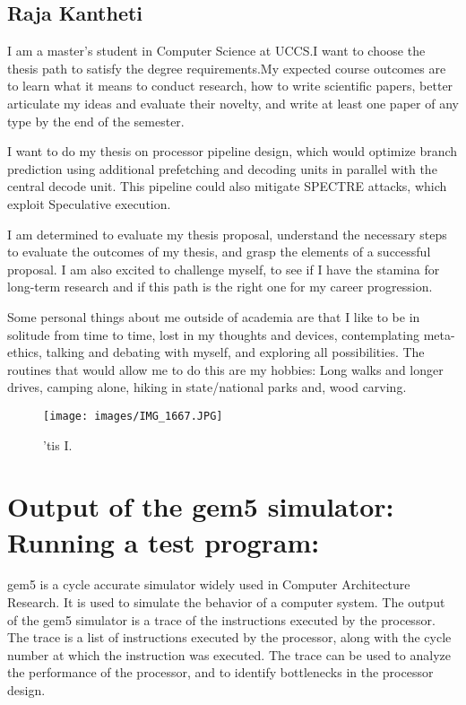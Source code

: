 \subsection{Raja Kantheti}
I am a master's student in Computer Science at UCCS.\@ I want to choose the thesis path to satisfy the degree requirements.\@ My expected course outcomes are to learn what it means to conduct research, how to write scientific papers, better articulate my ideas and evaluate their novelty, and write at least one paper of any type by the end of the semester.

I want to do my thesis on processor pipeline design, which would optimize branch prediction using additional prefetching and decoding units in parallel with the central decode unit. This pipeline could also mitigate SPECTRE attacks, which exploit Speculative execution. 

I am determined to evaluate my thesis proposal, understand the necessary steps to evaluate the outcomes of my thesis, and grasp the elements of a successful proposal. I am also excited to challenge myself, to see if I have the stamina for long-term research and if this path is the right one for my career progression.

Some personal things about me outside of academia are that I like to be in solitude from time to time, lost in my thoughts and devices, contemplating meta-ethics, talking and debating with myself, and exploring all possibilities. The routines that would allow me to do this are my hobbies: Long walks and longer drives, camping alone, hiking in state/national parks and, wood carving. 
\begin{figure}[h]
\centering
\texttt{[image: images/IMG\_1667.JPG]}
\caption{'tis I. }
\end{figure}

\section*{Output of the gem5 simulator: Running a test program: }
gem5 is a cycle accurate simulator widely used in Computer Architecture Research. 
It is used to simulate the behavior of a computer system. 
The output of the gem5 simulator is a trace of the instructions executed by the processor. 
The trace is a list of instructions executed by the processor, along with the cycle number at which the instruction was executed.
The trace can be used to analyze the performance of the processor, and to identify bottlenecks in the processor design.

